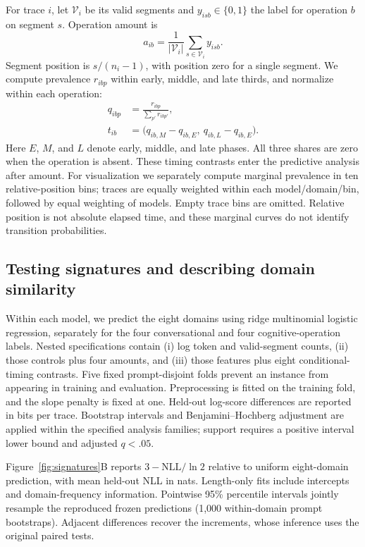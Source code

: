 For trace $i$, let $\mathcal V_i$ be its valid segments and $y_{isb}\in\{0,1\}$ the label for operation $b$ on segment $s$. Operation amount is
\begin{equation}
a_{ib}=\frac{1}{|\mathcal V_i|}\sum_{s\in\mathcal V_i}y_{isb}.
\end{equation}
Segment position is $s/(n_i-1)$, with position zero for a single segment. We compute prevalence $r_{ibp}$ within early, middle, and late thirds, and normalize within each operation:
\begin{equation}
\begin{aligned}
q_{ibp}&=\frac{r_{ibp}}{\sum_{p'}r_{ibp'}},\\
t_{ib}&=\big(q_{ib,M}-q_{ib,E},\ q_{ib,L}-q_{ib,E}\big).
\end{aligned}
\end{equation}
Here $E$, $M$, and $L$ denote early, middle, and late phases. All three shares are zero when the operation is absent. These timing contrasts enter the predictive analysis after amount. For visualization we separately compute marginal prevalence in ten relative-position bins; traces are equally weighted within each model/domain/bin, followed by equal weighting of models. Empty trace bins are omitted. Relative position is not absolute elapsed time, and these marginal curves do not identify transition probabilities.

\subsection{Testing signatures and describing domain similarity}
Within each model, we predict the eight domains using ridge multinomial logistic regression, separately for the four conversational and four cognitive-operation labels. Nested specifications contain (i) log token and valid-segment counts, (ii) those controls plus four amounts, and (iii) those features plus eight conditional-timing contrasts. Five fixed prompt-disjoint folds prevent an instance from appearing in training and evaluation. Preprocessing is fitted on the training fold, and the slope penalty is fixed at one. Held-out log-score differences are reported in bits per trace. Bootstrap intervals and Benjamini--Hochberg adjustment are applied within the specified analysis families; support requires a positive interval lower bound and adjusted $q<.05$.

Figure~\ref{fig:signatures}B reports $3-\mathrm{NLL}/\ln 2$ relative to uniform eight-domain prediction, with mean held-out NLL in nats. Length-only fits include intercepts and domain-frequency information. Pointwise 95\% percentile intervals jointly resample the reproduced frozen predictions (1,000 within-domain prompt bootstraps). Adjacent differences recover the increments, whose inference uses the original paired tests.

